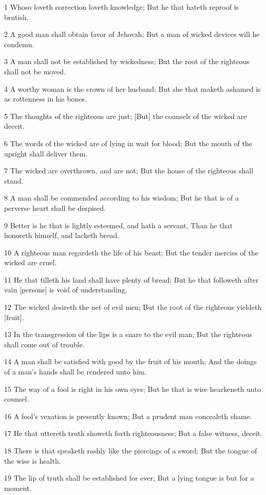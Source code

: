 \par 1 Whoso loveth correction loveth knowledge; But he that hateth reproof is brutish.
\par 2 A good man shall obtain favor of Jehovah; But a man of wicked devices will he condemn.
\par 3 A man shall not be established by wickedness; But the root of the righteous shall not be moved.
\par 4 A worthy woman is the crown of her husband; But she that maketh ashamed is as rottenness in his bones.
\par 5 The thoughts of the righteous are just; [But] the counsels of the wicked are deceit.
\par 6 The words of the wicked are of lying in wait for blood; But the mouth of the upright shall deliver them.
\par 7 The wicked are overthrown, and are not; But the house of the righteous shall stand.
\par 8 A man shall be commended according to his wisdom; But he that is of a perverse heart shall be despised.
\par 9 Better is he that is lightly esteemed, and hath a servant, Than he that honoreth himself, and lacketh bread.
\par 10 A righteous man regardeth the life of his beast; But the tender mercies of the wicked are cruel.
\par 11 He that tilleth his land shall have plenty of bread; But he that followeth after vain [persons] is void of understanding.
\par 12 The wicked desireth the net of evil men; But the root of the righteous yieldeth [fruit].
\par 13 In the transgression of the lips is a snare to the evil man; But the righteous shall come out of trouble.
\par 14 A man shall be satisfied with good by the fruit of his mouth; And the doings of a man's hands shall be rendered unto him.
\par 15 The way of a fool is right in his own eyes; But he that is wise hearkeneth unto counsel.
\par 16 A fool's vexation is presently known; But a prudent man concealeth shame.
\par 17 He that uttereth truth showeth forth righteousness; But a false witness, deceit.
\par 18 There is that speaketh rashly like the piercings of a sword; But the tongue of the wise is health.
\par 19 The lip of truth shall be established for ever; But a lying tongue is but for a moment.
